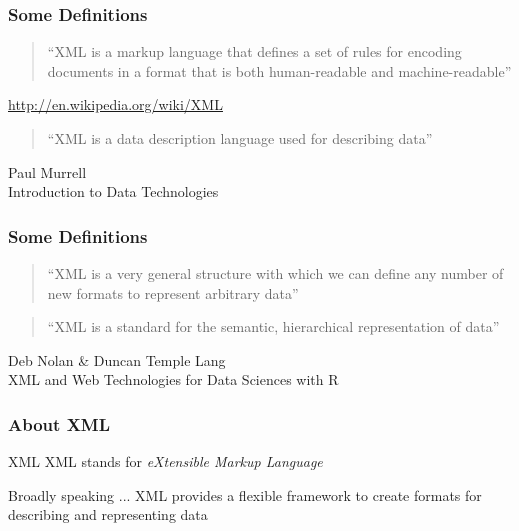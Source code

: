 \documentclass[svgnames]{beamer}
\begin{document}
\begin{frame}
\frametitle{Some Definitions}

\begin{quotation}
``XML is a markup language that defines a set of rules for encoding documents in a format that is both human-readable and machine-readable''
\end{quotation}

{\footnotesize 
\hspace{8mm} \url{http://en.wikipedia.org/wiki/XML}
}

\bigskip
\begin{quotation}
``XML is a data description language used for describing data''
\end{quotation}

{\footnotesize 
\hspace{8mm} {\hilit Paul Murrell} \\
\hspace{8mm} {\lolit Introduction to Data Technologies}
}

\end{frame}


\begin{frame}
\frametitle{Some Definitions}

\begin{quotation}
``XML is a very general structure with which we can define any number of new formats to represent arbitrary data''
\end{quotation}

\begin{quotation}
``XML is a standard for the semantic, hierarchical representation of data''
\end{quotation}

{\footnotesize 
\hspace{8mm} {\hilit Deb Nolan \& Duncan Temple Lang} \\
\hspace{8mm} {\lolit XML and Web Technologies for Data Sciences with R}
}

\end{frame}


\begin{frame}
\frametitle{About XML}

\begin{block}{XML}
XML stands for \emph{eXtensible Markup Language}
\end{block}

\begin{block}{Broadly speaking ...}
XML provides a flexible framework to create formats for describing and representing data
\end{block}

\end{frame}
\end{document}
